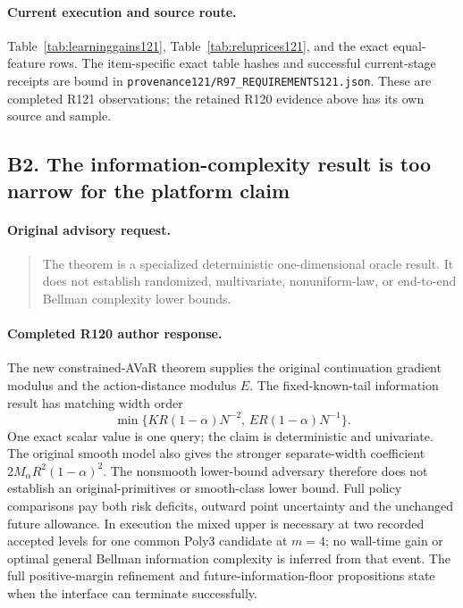 \paragraph{Current execution and source route.}
Table~\ref{tab:learninggains121}, Table~\ref{tab:reluprices121}, and the exact equal-feature rows.
The item-specific exact table hashes and successful current-stage receipts are bound in \nolinkurl{provenance121/R97_REQUIREMENTS121.json}. These are completed R121 observations; the retained R120 evidence above has its own source and sample.

\subsection{B2. The information-complexity result is too narrow for the platform claim}
\label{response121:B2}

\paragraph{Original advisory request.}
\begin{quote}
The theorem is a specialized deterministic one-dimensional oracle result. It does not establish randomized, multivariate, nonuniform-law, or end-to-end Bellman complexity lower bounds.
\end{quote}

\paragraph{Completed R120 author response.}
The new constrained-AVaR theorem supplies the original continuation gradient modulus and the action-distance modulus $E$. The fixed-known-tail information result has matching width order
\[
 \min\{KR(1-\alpha)N^{-2},\,ER(1-\alpha)N^{-1}\}.
\]
One exact scalar value is one query; the claim is deterministic and univariate. The original smooth model also gives the stronger separate-width coefficient $2M_\alpha R^2(1-\alpha)^2$. The nonsmooth lower-bound adversary therefore does not establish an original-primitives or smooth-class lower bound. Full policy comparisons pay both risk deficits, outward point uncertainty and the unchanged future allowance. In execution the mixed upper is necessary at two recorded accepted levels for one common Poly3 candidate at $m=4$; no wall-time gain or optimal general Bellman information complexity is inferred from that event. The full positive-margin refinement and future-information-floor propositions state when the interface can terminate successfully.

